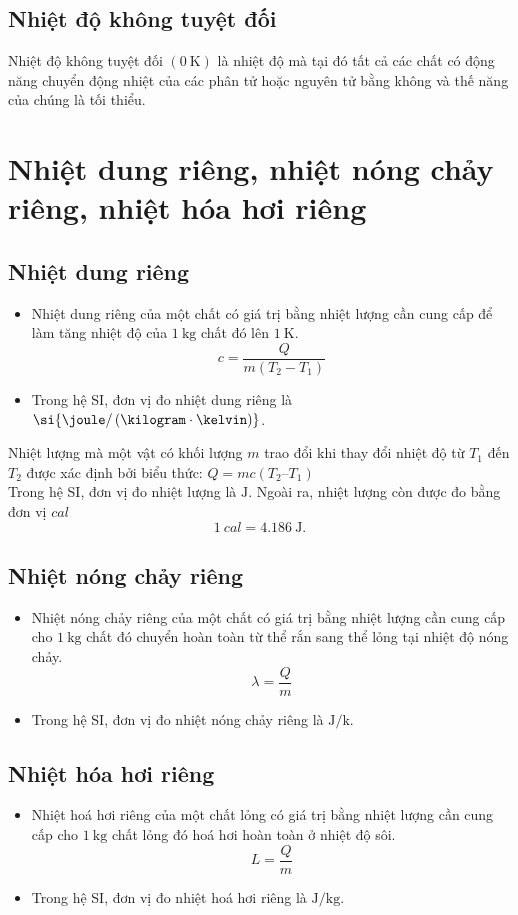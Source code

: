 \subsection{Nhiệt độ không tuyệt đối}
Nhiệt độ không tuyệt đối $\left(\SI{0}{\kelvin}\right)$ là nhiệt độ mà tại đó tất cả các chất có động năng chuyển động nhiệt của các phân tử hoặc nguyên tử bằng không và thế năng của chúng là tối thiểu.
\section{Nhiệt dung riêng, nhiệt nóng chảy riêng, nhiệt hóa hơi riêng}
\subsection{Nhiệt dung riêng}
\begin{itemize}
	\item Nhiệt dung riêng của một chất có giá trị bằng nhiệt lượng cần cung cấp để làm tăng nhiệt độ của $\SI{1}{\kilogram}$ chất đó lên $\SI{1}{\kelvin}$.
	\begin{equation}
		c=\dfrac{Q}{m\left(T_2-T_1\right)}
	\end{equation}
	\item Trong hệ SI, đơn vị đo nhiệt dung riêng là $\si{\joule/\left(\kilogram\cdot\kelvin\right)}$.
\end{itemize}
Nhiệt lượng mà một vật có khối lượng $m$ trao đổi khi thay đổi nhiệt độ từ $T_1$ đến $T_2$ được xác định bởi biểu thức: $Q = mc\left(T_2 – T_1\right)$\\
Trong hệ SI, đơn vị đo nhiệt lượng là $\si{\joule}$. Ngoài ra, nhiệt lượng còn được đo bằng đơn vị $\si{cal}$
$$\SI{1}{cal}=\SI{4,186}{\joule}.$$
\subsection{Nhiệt nóng chảy riêng}
\begin{itemize}
	\item Nhiệt nóng chảy riêng của một chất có giá trị bằng nhiệt lượng cần cung cấp cho $\SI{1}{\kilogram}$ chất đó chuyển hoàn toàn từ thể rắn sang thể lỏng tại nhiệt độ nóng chảy.\\
	\begin{equation}
		\lambda=\dfrac{Q}{m}
	\end{equation}
	\item Trong hệ SI, đơn vị đo nhiệt nóng chảy riêng là $\si{\joule/\kilo}$.
\end{itemize}
\subsection{Nhiệt hóa hơi riêng}
\begin{itemize}
	\item Nhiệt hoá hơi riêng của một chất lỏng có giá trị bằng nhiệt lượng cần cung cấp cho $\SI{1}{\kilogram}$ chất lỏng đó hoá hơi hoàn toàn ở nhiệt độ sôi.
	\begin{equation}
		L=\dfrac{Q}{m}
	\end{equation}
	\item Trong hệ SI, đơn vị đo nhiệt hoá hơi riêng là $\si{\joule/\kilogram}$.
\end{itemize}

